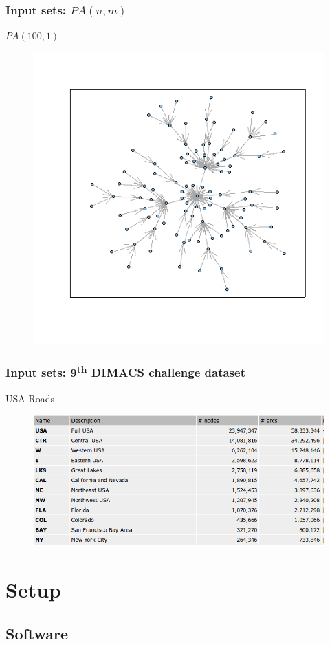 \documentclass{beamer}
\begin{document}
\begin{frame}
\frametitle{Input sets: $PA(n, m)$}
\centering
$PA(100, 1)$
\begin{figure}
 \includegraphics[width=.7\textwidth]{graphPA.png}
\end{figure}
\end{frame}

\begin{frame}
\frametitle{Input sets: 9\textsuperscript{th} DIMACS challenge dataset}
\centering
USA Roads
\begin{figure}
 \includegraphics[width=.7\textwidth]{graphUSA.png}
\end{figure}
\end{frame}


\section{Setup}

\subsection{Software}
\end{document}
